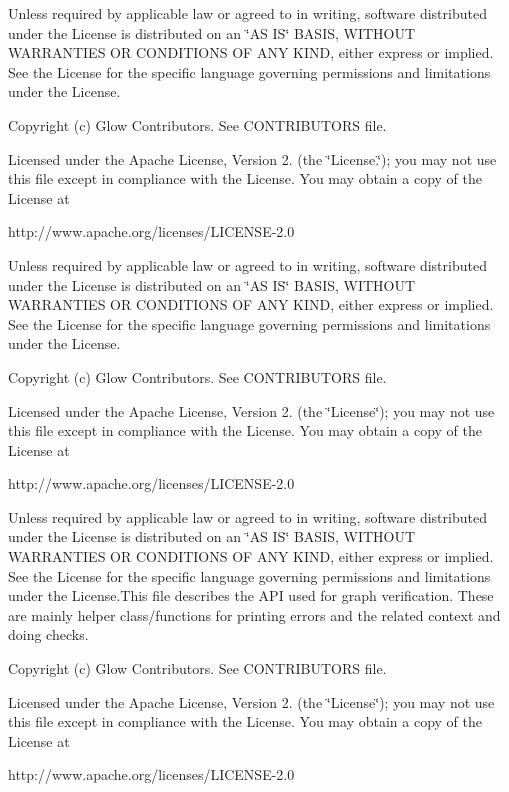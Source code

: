 Unless required by applicable law or agreed to in writing, software distributed under the License is distributed on an \char`\"{}\+A\+S I\+S\char`\"{} B\+A\+S\+IS, W\+I\+T\+H\+O\+UT W\+A\+R\+R\+A\+N\+T\+I\+ES OR C\+O\+N\+D\+I\+T\+I\+O\+NS OF A\+NY K\+I\+ND, either express or implied. See the License for the specific language governing permissions and limitations under the License.

Copyright (c) Glow Contributors. See C\+O\+N\+T\+R\+I\+B\+U\+T\+O\+RS file.

Licensed under the Apache License, Version 2. (the \char`\"{}\+License.\char`\"{}); you may not use this file except in compliance with the License. You may obtain a copy of the License at \begin{DoxyVerb}http://www.apache.org/licenses/LICENSE-2.0
\end{DoxyVerb}


Unless required by applicable law or agreed to in writing, software distributed under the License is distributed on an \char`\"{}\+A\+S I\+S\char`\"{} B\+A\+S\+IS, W\+I\+T\+H\+O\+UT W\+A\+R\+R\+A\+N\+T\+I\+ES OR C\+O\+N\+D\+I\+T\+I\+O\+NS OF A\+NY K\+I\+ND, either express or implied. See the License for the specific language governing permissions and limitations under the License.

Copyright (c) Glow Contributors. See C\+O\+N\+T\+R\+I\+B\+U\+T\+O\+RS file.

Licensed under the Apache License, Version 2. (the \char`\"{}\+License\char`\"{}); you may not use this file except in compliance with the License. You may obtain a copy of the License at \begin{DoxyVerb}http://www.apache.org/licenses/LICENSE-2.0
\end{DoxyVerb}


Unless required by applicable law or agreed to in writing, software distributed under the License is distributed on an \char`\"{}\+A\+S I\+S\char`\"{} B\+A\+S\+IS, W\+I\+T\+H\+O\+UT W\+A\+R\+R\+A\+N\+T\+I\+ES OR C\+O\+N\+D\+I\+T\+I\+O\+NS OF A\+NY K\+I\+ND, either express or implied. See the License for the specific language governing permissions and limitations under the License.\+This file describes the A\+PI used for graph verification. These are mainly helper class/functions for printing errors and the related context and doing checks.

Copyright (c) Glow Contributors. See C\+O\+N\+T\+R\+I\+B\+U\+T\+O\+RS file.

Licensed under the Apache License, Version 2. (the \char`\"{}\+License\char`\"{}); you may not use this file except in compliance with the License. You may obtain a copy of the License at \begin{DoxyVerb}http://www.apache.org/licenses/LICENSE-2.0
\end{DoxyVerb}


